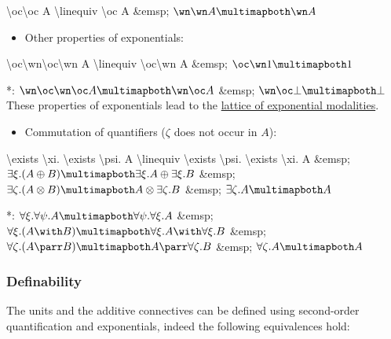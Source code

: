 \textbackslash{}oc\textbackslash{}oc A \textbackslash{}linequiv
\textbackslash{}oc A \&emsp; \(\wn\wn A \linequiv \wn A\)

\begin{itemize}
\tightlist
\item
  Other properties of exponentials:

  \begin{description}
  \tightlist
  \item[]
  \end{description}
\end{itemize}

\textbackslash{}oc\textbackslash{}wn\textbackslash{}oc\textbackslash{}wn
A \textbackslash{}linequiv \textbackslash{}oc\textbackslash{}wn A
\&emsp; \(\oc\wn \one \linequiv \one\)

*: \(\wn\oc\wn\oc A \linequiv \wn\oc A\) \&emsp;
\(\wn\oc \bot \linequiv \bot\) These properties of exponentials lead to
the \href{lattice_of_exponential_modalities}{lattice of exponential
modalities}.

\begin{itemize}
\tightlist
\item
  Commutation of quantifiers (\(\zeta\) does not occur in \(A\)):

  \begin{description}
  \tightlist
  \item[]
  \end{description}
\end{itemize}

\textbackslash{}exists \textbackslash{}xi. \textbackslash{}exists
\textbackslash{}psi. A \textbackslash{}linequiv \textbackslash{}exists
\textbackslash{}psi. \textbackslash{}exists \textbackslash{}xi. A
\&emsp;
\(\exists \xi.(A \plus B) \linequiv \exists \xi.A \plus \exists \xi.B\)
\&emsp; \(\exists \zeta.(A\tens B) \linequiv A\tens\exists \zeta.B\)
\&emsp; \(\exists \zeta.A \linequiv A\)

*:
\(\forall \xi. \forall \psi. A \linequiv \forall \psi. \forall \xi. A\)
\&emsp;
\(\forall \xi.(A \with B) \linequiv \forall \xi.A \with \forall \xi.B\)
\&emsp; \(\forall \zeta.(A\parr B) \linequiv A\parr\forall \zeta.B\)
\&emsp; \(\forall \zeta.A \linequiv A\)

\subsubsection{Definability}\label{definability}

The units and the additive connectives can be defined using second-order
quantification and exponentials, indeed the following equivalences hold:

